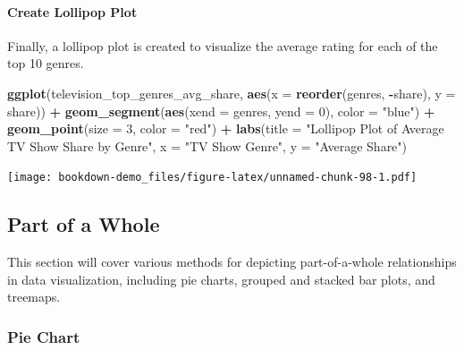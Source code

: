 \documentclass[
  b5paper]{book}
\newenvironment{Shaded}{\begin{snugshade}}{\end{snugshade}}
\newcommand{\AttributeTok}[1]{\textcolor[rgb]{0.13,0.29,0.53}{#1}}
\newcommand{\DecValTok}[1]{\textcolor[rgb]{0.00,0.00,0.81}{#1}}
\newcommand{\FunctionTok}[1]{\textcolor[rgb]{0.13,0.29,0.53}{\textbf{#1}}}
\newcommand{\NormalTok}[1]{#1}
\newcommand{\SpecialCharTok}[1]{\textcolor[rgb]{0.81,0.36,0.00}{\textbf{#1}}}
\newcommand{\StringTok}[1]{\textcolor[rgb]{0.31,0.60,0.02}{#1}}
\begin{document}
\hypertarget{create-lollipop-plot}{%
\paragraph*{Create Lollipop Plot}\label{create-lollipop-plot}}

Finally, a lollipop plot is created to visualize the average rating for each of the top 10 genres.

\begin{Shaded}
\begin{Highlighting}[]
\FunctionTok{ggplot}\NormalTok{(television\_top\_genres\_avg\_share, }\FunctionTok{aes}\NormalTok{(}\AttributeTok{x =} \FunctionTok{reorder}\NormalTok{(genres, }\SpecialCharTok{{-}}\NormalTok{share), }\AttributeTok{y =}\NormalTok{ share)) }\SpecialCharTok{+}
  \FunctionTok{geom\_segment}\NormalTok{(}\FunctionTok{aes}\NormalTok{(}\AttributeTok{xend =}\NormalTok{ genres, }\AttributeTok{yend =} \DecValTok{0}\NormalTok{), }\AttributeTok{color =} \StringTok{"blue"}\NormalTok{) }\SpecialCharTok{+}
  \FunctionTok{geom\_point}\NormalTok{(}\AttributeTok{size =} \DecValTok{3}\NormalTok{, }\AttributeTok{color =} \StringTok{"red"}\NormalTok{) }\SpecialCharTok{+}
  \FunctionTok{labs}\NormalTok{(}\AttributeTok{title =} \StringTok{"Lollipop Plot of Average TV Show Share by Genre"}\NormalTok{,}
       \AttributeTok{x =} \StringTok{"TV Show Genre"}\NormalTok{,}
       \AttributeTok{y =} \StringTok{"Average Share"}\NormalTok{)}
\end{Highlighting}
\end{Shaded}

\texttt{[image: bookdown-demo\_files/figure-latex/unnamed-chunk-98-1.pdf]}

\hypertarget{part-of-a-whole}{%
\subsection*{Part of a Whole}\label{part-of-a-whole}}

This section will cover various methods for depicting part-of-a-whole relationships in data visualization, including pie charts, grouped and stacked bar plots, and treemaps.

\hypertarget{pie-chart}{%
\subsubsection*{Pie Chart}\label{pie-chart}}
\end{document}
